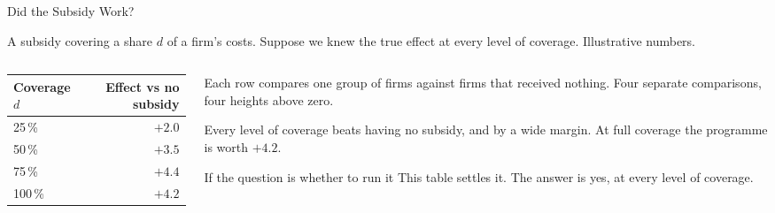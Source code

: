 \documentclass[main.tex]{subfiles}
\begin{document}
\begin{frame}{Did the Subsidy Work?}

  A subsidy covering a share $d$ of a firm's costs. Suppose we knew the true
  effect at every level of coverage. Illustrative numbers.

  \medskip
  \begin{columns}[T]
    \begin{column}{0.40\textwidth}
      \begin{center}\small
      \begin{tabular}{@{}lr@{}}
        \toprule
        Coverage $d$ & Effect vs no subsidy \\
        \midrule
        25\,\%  & $+2.0$ \\
        50\,\%  & $+3.5$ \\
        75\,\%  & $+4.4$ \\
        100\,\% & $+4.2$ \\
        \bottomrule
      \end{tabular}
      \end{center}
    \end{column}
    \begin{column}{0.56\textwidth}
      Each row compares one group of firms against firms that received nothing.
      Four separate comparisons, four heights above zero.

      \smallskip
      Every level of coverage beats having no subsidy, and by a wide margin. At
      full coverage the programme is worth $+4.2$.

      \smallskip
      \begin{block}{\footnotesize If the question is whether to run it}
        \footnotesize
        This table settles it. The answer is yes, at every level of coverage.
      \end{block}
    \end{column}
  \end{columns}

\end{frame}
\end{document}
